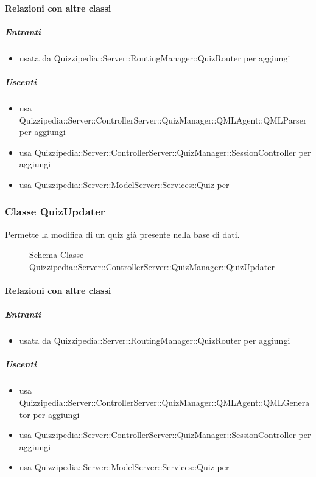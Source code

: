 \paragraph{Relazioni con altre classi}
\subparagraph{Entranti}
\begin{itemize}
\item usata da Quizzipedia::Server::RoutingManager::QuizRouter per aggiungi
\end{itemize}
\subparagraph{Uscenti}
\begin{itemize}
\item usa Quizzipedia::Server::ControllerServer::QuizManager::QMLAgent::QMLParser per aggiungi
\item usa Quizzipedia::Server::ControllerServer::QuizManager::SessionController per aggiungi
\item usa Quizzipedia::Server::ModelServer::Services::Quiz per 
\end{itemize}
\subsubsection{Classe QuizUpdater}
Permette la modifica di un quiz già presente nella base di dati.
\begin{figure}[H]
\centering
\noindent{}
\caption[Schema Classe QuizUpdater]{Schema Classe Quizzipedia::Server::ControllerServer::QuizManager::QuizUpdater}
\end{figure}
\paragraph{Relazioni con altre classi}
\subparagraph{Entranti}
\begin{itemize}
\item usata da Quizzipedia::Server::RoutingManager::QuizRouter per aggiungi
\end{itemize}
\subparagraph{Uscenti}
\begin{itemize}
\item usa Quizzipedia::Server::ControllerServer::QuizManager::QMLAgent::QMLGenerator per aggiungi
\item usa Quizzipedia::Server::ControllerServer::QuizManager::SessionController per aggiungi
\item usa Quizzipedia::Server::ModelServer::Services::Quiz per 
\end{itemize}
